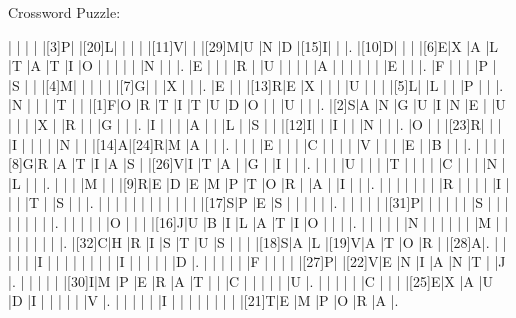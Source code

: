 \documentclass[12pt]{article}
\begin{document}
\begin{center}
  \huge{Crossword Puzzle:}
\end{center}
\vspace{1.5cm}
\begin{Puzzle}{22}{25}
  |{}  |{}  |{}  |{}  |[3]P|{}  |[20]L|{}  |{}  |{}  |{}  |[11]V|{}  |{}  |[29]M|U   |N   |D   |[15]I|{}  |{}  |.
  |[10]D|{}  |{}  |{}  |[6]E|X   |A   |L   |T   |A   |T   |I   |O   |{}  |{}  |{}  |{}  |{}  |N   |{}  |{}  |.
  |E   |{}  |{}  |{}  |R   |{}  |U   |{}  |{}  |{}  |{}  |A   |{}  |{}  |{}  |{}  |{}  |{}  |E   |{}  |{}  |.
  |F   |{}  |{}  |{}  |P   |{}  |S   |{}  |{}  |[4]M|{}  |{}  |{}  |{}  |{}  |[7]G|{}  |{}  |X   |{}  |{}  |.
  |E   |{}  |{}  |[13]R|E   |X   |{}  |{}  |{}  |U   |{}  |{}  |{}  |[5]L|{}  |L   |{}  |{}  |P   |{}  |{}  |.
  |N   |{}  |{}  |{}  |T   |{}  |{}  |[1]F|O   |R   |T   |I   |T   |U   |D   |O   |{}  |{}  |U   |{}  |{}  |.
  |[2]S|A   |N   |G   |U   |I   |N   |E   |{}  |U   |{}  |{}  |{}  |X   |{}  |R   |{}  |{}  |G   |{}  |{}  |.
  |I   |{}  |{}  |{}  |A   |{}  |{}  |L   |{}  |S   |{}  |{}  |[12]I|{}  |{}  |I   |{}  |{}  |N   |{}  |{}  |.
  |O   |{}  |{}  |[23]R|{}  |{}  |{}  |I   |{}  |{}  |{}  |{}  |N   |{}  |{}  |[14]A|[24]R|M   |A   |{}  |{}  |.
  |{}  |{}  |{}  |E   |{}  |{}  |{}  |C   |{}  |{}  |{}  |{}  |V   |{}  |{}  |{}  |E   |{}  |B   |{}  |{}  |.
  |{}  |{}  |{}  |[8]G|R   |A   |T   |I   |A   |S   |{}  |[26]V|I   |T   |A   |{}  |G   |{}  |I   |{}  |{}  |.
  |{}  |{}  |{}  |U   |{}  |{}  |{}  |T   |{}  |{}  |{}  |{}  |C   |{}  |{}  |{}  |N   |{}  |L   |{}  |{}  |.
  |{}  |{}  |{}  |M   |{}  |{}  |[9]R|E   |D   |E   |M   |P   |T   |O   |R   |{}  |A   |{}  |I   |{}  |{}  |.
  |{}  |{}  |{}  |{}  |{}  |{}  |{}  |R   |{}  |{}  |{}  |{}  |I   |{}  |{}  |{}  |T   |{}  |S   |{}  |{}  |.
  |{}  |{}  |{}  |{}  |{}  |{}  |{}  |{}  |{}  |{}  |{}  |{}  |[17]S|P   |E   |S   |{}  |{}  |{}  |{}  |{}  |.
  |{}  |{}  |{}  |{}  |{}  |[31]P|{}  |{}  |{}  |{}  |{}  |{}  |S   |{}  |{}  |{}  |{}  |{}  |{}  |{}  |{}  |.
  |{}  |{}  |{}  |{}  |{}  |O   |{}  |{}  |{}  |[16]J|U   |B   |I   |L   |A   |T   |I   |O   |{}  |{}  |{}  |.
  |{}  |{}  |{}  |{}  |{}  |N   |{}  |{}  |{}  |{}  |{}  |{}  |M   |{}  |{}  |{}  |{}  |{}  |{}  |{}  |{}  |.
  |[32]C|H   |R   |I   |S   |T   |U   |S   |{}  |{}  |{}  |[18]S|A   |L   |[19]V|A   |T   |O   |R   |{}  |[28]A|.
  |{}  |{}  |{}  |{}  |{}  |I   |{}  |{}  |{}  |{}  |{}  |{}  |{}  |{}  |I   |{}  |{}  |{}  |{}  |{}  |D   |.
  |{}  |{}  |{}  |{}  |{}  |F   |{}  |{}  |{}  |{}  |[27]P|{}  |[22]V|E   |N   |I   |A   |N   |T   |{}  |J   |.
  |{}  |{}  |{}  |{}  |{}  |[30]I|M   |P   |E   |R   |A   |T   |{}  |{}  |C   |{}  |{}  |{}  |{}  |{}  |U   |.
  |{}  |{}  |{}  |{}  |{}  |C   |{}  |{}  |{}  |[25]E|X   |A   |U   |D   |I   |{}  |{}  |{}  |{}  |{}  |V   |.
  |{}  |{}  |{}  |{}  |{}  |I   |{}  |{}  |{}  |{}  |{}  |{}  |{}  |{}  |[21]T|E   |M   |P   |O   |R   |A   |.
\end{Puzzle}
\end{document}
